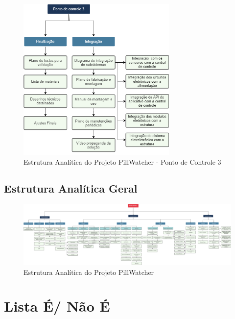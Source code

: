 \begin{apendicesenv}
\begin{figure}[H]
    \centering
    \includegraphics[width=0.7\textwidth]{figuras/eap_pc3.png}
    \caption{Estrutura Analítica do Projeto PillWatcher - Ponto de Controle 3 }
    \label{fig:eap_pc3}
\end{figure}

\begin{landscape}
\section{Estrutura Analítica Geral}
\begin{figure}[!htb]
    \centering
    \vspace{2cm}
    \hspace{-2cm}
    \includegraphics[width=1.55\textwidth, height=2\textheight,keepaspectratio]{figuras/EAP.pdf}
    \vspace{-5pt}
    \caption{Estrutura Analítica do Projeto PillWatcher}
\end{figure}
\end{landscape}
%

\chapter{Lista É/ Não É}
\label{Lista_app}


\end{apendicesenv}
